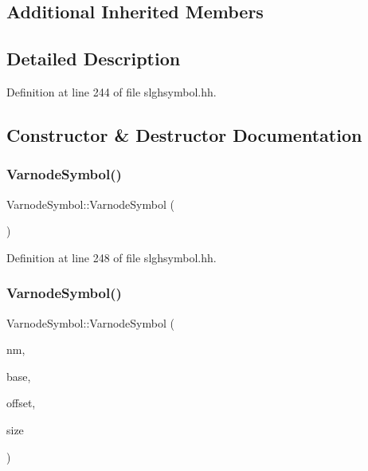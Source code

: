 \subsection*{Additional Inherited Members}


\subsection{Detailed Description}


Definition at line 244 of file slghsymbol.\+hh.



\subsection{Constructor \& Destructor Documentation}
\mbox{\label{class_varnode_symbol_aaab06d6ee9596372c4a0760af6ef422a}} 
\subsubsection{\texorpdfstring{VarnodeSymbol()}{VarnodeSymbol()}\hspace{0.1cm}{\footnotesize\ttfamily [1/2]}}
{\footnotesize\ttfamily Varnode\+Symbol\+::\+Varnode\+Symbol (\begin{DoxyParamCaption}\item[{void}]{ }\end{DoxyParamCaption})\hspace{0.3cm}{\ttfamily [inline]}}



Definition at line 248 of file slghsymbol.\+hh.

\mbox{\label{class_varnode_symbol_a60841906e74dd82c1df97982912ddc77}} 
\subsubsection{\texorpdfstring{VarnodeSymbol()}{VarnodeSymbol()}\hspace{0.1cm}{\footnotesize\ttfamily [2/2]}}
{\footnotesize\ttfamily Varnode\+Symbol\+::\+Varnode\+Symbol (\begin{DoxyParamCaption}\item[{const string \&}]{nm,  }\item[{\mbox{\hyperlink{class_addr_space}{Addr\+Space}} $\ast$}]{base,  }\item[{\mbox{\hyperlink{types_8h_a2db313c5d32a12b01d26ac9b3bca178f}{uintb}}}]{offset,  }\item[{int4}]{size }\end{DoxyParamCaption})}



